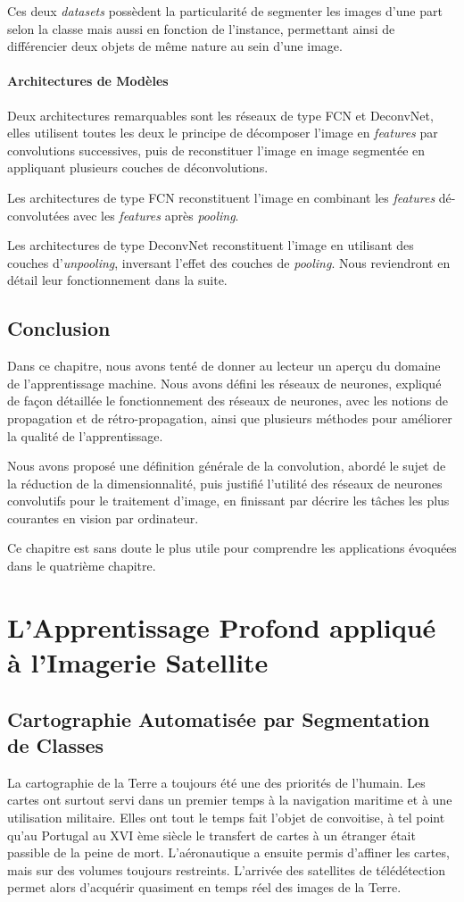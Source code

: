 \documentclass[a4paper, 11pt]{report}
\begin{document}
Ces deux \emph{datasets} possèdent la particularité de segmenter les images d'une part selon la classe mais aussi en fonction de l'instance, permettant ainsi de différencier deux objets de même nature au sein d'une image.
\subsubsection{Architectures de Modèles}
Deux architectures remarquables sont les réseaux de type FCN et DeconvNet, elles utilisent toutes les deux le principe de décomposer l'image en \emph{features} par convolutions successives, puis de reconstituer l'image en image segmentée en appliquant plusieurs couches de déconvolutions.

Les architectures de type FCN reconstituent l'image en combinant les \emph{features} dé-convolutées avec les \emph{features} après \emph{pooling}.

Les architectures de type DeconvNet reconstituent l'image en utilisant des couches d'\emph{unpooling}, inversant l'effet des couches de \emph{pooling}. Nous reviendront en détail leur fonctionnement dans la suite.

\section{Conclusion}
Dans ce chapitre, nous avons tenté de donner au lecteur un aperçu du domaine de l'apprentissage machine.
Nous avons défini les réseaux de neurones, expliqué de façon détaillée le fonctionnement des réseaux de neurones, avec les notions de propagation et de rétro-propagation, ainsi que plusieurs méthodes pour améliorer la qualité de l'apprentissage.

Nous avons proposé une définition générale de la convolution, abordé le sujet de la réduction de la dimensionnalité, puis justifié l'utilité des réseaux de neurones convolutifs pour le traitement d'image, en finissant par décrire les tâches les plus courantes en vision par ordinateur.

Ce chapitre est sans doute le plus utile pour comprendre les applications évoquées dans le quatrième chapitre.
\chapter{L'Apprentissage Profond appliqué à l'Imagerie Satellite}
\section{Cartographie Automatisée par Segmentation de Classes}
La cartographie de la Terre a toujours été une des priorités de l'humain.
Les cartes ont surtout servi dans un premier temps à la navigation maritime et à une utilisation militaire. Elles ont tout le temps fait l'objet de convoitise, à tel point qu'au Portugal au XVI ème siècle le transfert de cartes à un étranger était passible de la peine de mort. L'aéronautique a ensuite permis d'affiner les cartes, mais sur des volumes toujours restreints. L'arrivée des satellites de télédétection permet alors d'acquérir quasiment en temps réel des images de la Terre.
\end{document}
